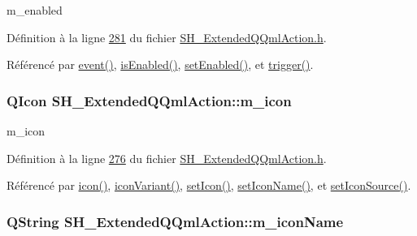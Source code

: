 m\-\_\-enabled 



Définition à la ligne \hyperlink{SH__ExtendedQQmlAction_8h_source_l00281}{281} du fichier \hyperlink{SH__ExtendedQQmlAction_8h_source}{S\-H\-\_\-\-Extended\-Q\-Qml\-Action.\-h}.



Référencé par \hyperlink{classSH__ExtendedQQmlAction_a218053d85e9fc54e06ab39b1bb37dd4b}{event()}, \hyperlink{classSH__ExtendedQQmlAction_a4da1f74b1aa64958ea18b2b55648b7db}{is\-Enabled()}, \hyperlink{classSH__ExtendedQQmlAction_aff39518e3dbf185d6b91f827521fa358}{set\-Enabled()}, et \hyperlink{classSH__ExtendedQQmlAction_abf79bb6cb923d27e2fc5dfc05ff513c2}{trigger()}.

\hypertarget{classSH__ExtendedQQmlAction_a4386f56e28c2c70cfedd16c1d8c2c4a4}{
\subsubsection[{m\-\_\-icon}]{\setlength{\rightskip}{0pt plus 5cm}Q\-Icon S\-H\-\_\-\-Extended\-Q\-Qml\-Action\-::m\-\_\-icon\hspace{0.3cm}{\ttfamily [private]}}}\label{classSH__ExtendedQQmlAction_a4386f56e28c2c70cfedd16c1d8c2c4a4}


m\-\_\-icon 



Définition à la ligne \hyperlink{SH__ExtendedQQmlAction_8h_source_l00276}{276} du fichier \hyperlink{SH__ExtendedQQmlAction_8h_source}{S\-H\-\_\-\-Extended\-Q\-Qml\-Action.\-h}.



Référencé par \hyperlink{classSH__ExtendedQQmlAction_a1ad6dd5cce1909ac371f70b5bc57d927}{icon()}, \hyperlink{classSH__ExtendedQQmlAction_a53e1244ef9cc77483684fdf57c236c76}{icon\-Variant()}, \hyperlink{classSH__ExtendedQQmlAction_aca3c862c9092a2cd7c2098f2132b0a45}{set\-Icon()}, \hyperlink{classSH__ExtendedQQmlAction_a348526d65cd47b4ea6378e2a62065135}{set\-Icon\-Name()}, et \hyperlink{classSH__ExtendedQQmlAction_ae34fe314ba335d65d99932b27f1404f7}{set\-Icon\-Source()}.

\hypertarget{classSH__ExtendedQQmlAction_a3375d1504e5ec862ed05500bf529d95c}{
\subsubsection[{m\-\_\-icon\-Name}]{\setlength{\rightskip}{0pt plus 5cm}Q\-String S\-H\-\_\-\-Extended\-Q\-Qml\-Action\-::m\-\_\-icon\-Name\hspace{0.3cm}{\ttfamily [private]}}}\label{classSH__ExtendedQQmlAction_a3375d1504e5ec862ed05500bf529d95c}


